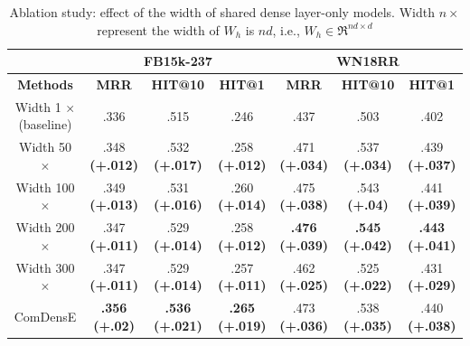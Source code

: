 \begin{table}
\centering
\caption{Ablation study: effect of the width of shared dense layer-only models. Width $n\times$ represent the width of $W_h$ is $nd$, i.e.,  $W_h \in \Re^{nd\times d}$}
\label{table7}
\begin{tabular}{cccc|ccc}
\hline
 & \multicolumn{3}{c}{\textbf{FB15k-237}} & \multicolumn{3}{c}{\textbf{WN18RR}}\\
 \hline
 \textbf{Methods} &
 \textbf{MRR} &
 \textbf{HIT@10} &
 \textbf{HIT@1} &
 \textbf{MRR} &
 \textbf{HIT@10} &
 \textbf{HIT@1} \\
 \hline
 Width 1 $\times$ (baseline) & .336 & .515  & .246 & .437 & .503 & .402\\
 \hline
 Width 50 $\times$ & .348 \textbf{(+.012)} & .532 \textbf{(+.017)} & .258 \textbf{(+.012)} & .471 \textbf{(+.034)} & .537 \textbf{(+.034)}& .439 \textbf{(+.037)}\\
 Width 100 $\times$ & .349 \textbf{(+.013)} & .531 \textbf{(+.016)} & .260 \textbf{(+.014)} & .475 \textbf{(+.038)} & .543 \textbf{(+.04)}  & .441 \textbf{(+.039)}\\
 Width 200 $\times$ & .347 \textbf{(+.011)} & .529 \textbf{(+.014)} & .258 \textbf{(+.012)} & \textbf{.476} \textbf{(+.039)}& \textbf{.545} \textbf{(+.042)}& \textbf{.443} \textbf{(+.041)}\\
 Width 300 $\times$ & .347 \textbf{(+.011)} & .529 \textbf{(+.014)} & .257 \textbf{(+.011)} & .462 \textbf{(+.025)} & .525 \textbf{(+.022)} & .431 \textbf{(+.029)}\\
 \hline
  ComDensE & \textbf{.356 (+.02)}  &  \textbf{.536 (+.021)} & \textbf{.265 (+.019)} & .473 \textbf{(+.036)}  & .538 \textbf{(+.035)} & .440 \textbf{(+.038)}\\
  \hline
\end{tabular}
\end{table}

